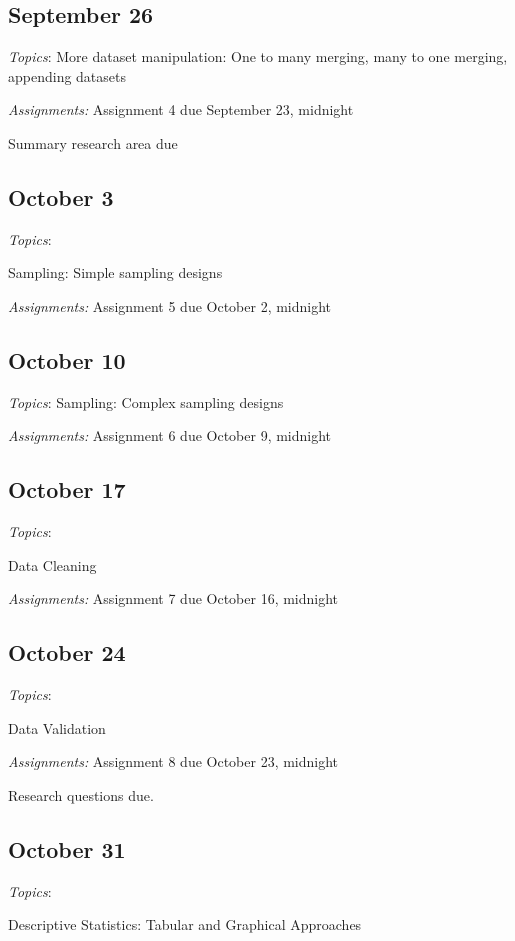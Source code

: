 \documentclass[12pt]{article}
\begin{document}
\begin{flushleft}
\subsection{September 26}


\textit{Topics}:
More dataset manipulation: One to many merging, many to one merging, appending datasets

\textit {Assignments:}
Assignment 4 due September 23, midnight

Summary research area due

\subsection{October 3}


\textit{Topics}:

Sampling: Simple sampling designs

\textit {Assignments:}
Assignment 5 due October 2, midnight
\subsection{October 10}


\textit{Topics}:
Sampling: Complex sampling designs


\textit {Assignments:}
Assignment 6 due October 9, midnight
\subsection{October 17}


\textit{Topics}:

Data Cleaning

\textit {Assignments:}
Assignment 7 due October 16, midnight

\subsection{October 24}


\textit{Topics}:

Data Validation

\textit {Assignments:}
Assignment 8 due October 23, midnight

Research questions due. 

\subsection{October 31}


\textit{Topics}:

Descriptive Statistics: Tabular and Graphical Approaches


\end{flushleft}
\end{document}
